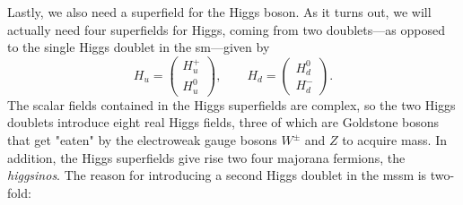 Lastly, we also need a superfield for the Higgs boson. As it turns out, we will actually need four superfields for Higgs, coming from two doublets---as opposed to the single Higgs doublet in the \gls{sm}---given by
\begin{equation}\label{eq:higgs_superfields}
    H_u = \begin{pmatrix}
        H_u^+ \\ H_u^0
    \end{pmatrix}, \qquad H_d = \begin{pmatrix}
        H_d^0 \\ H_d^-
    \end{pmatrix}.
\end{equation}
The scalar fields contained in the Higgs superfields are complex, so the two Higgs doublets introduce eight real Higgs fields, three of which are Goldstone bosons that get "eaten" by the electroweak gauge bosons $W^\pm$ and $Z$ to acquire mass.
In addition, the Higgs superfields give rise two four majorana fermions, the \emph{higgsinos}.
The reason for introducing a second Higgs doublet in the \gls{mssm} is two-fold:
